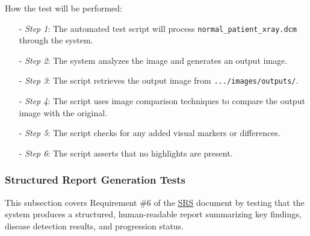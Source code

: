 \documentclass[12pt, titlepage]{article}
\begin{document}
\begin{enumerate}
How the test will be performed:
\begin{itemize}
\item[-] \textit{Step 1}: The automated test script will process \texttt{normal\_patient\_xray.dcm} through the system.
\item[-] \textit{Step 2}: The system analyzes the image and generates an output image.
\item[-] \textit{Step 3}: The script retrieves the output image from \texttt{.../images/outputs/}.
\item[-] \textit{Step 4}: The script uses image comparison techniques to compare the output image with the original.
\item[-] \textit{Step 5}: The script checks for any added visual markers or differences.
\item[-] \textit{Step 6}: The script asserts that no highlights are present.
\end{itemize}
\end{enumerate}

\subsubsection{Structured Report Generation Tests}

This subsection covers Requirement \#6 of the \href{https://github.com/RezaJodeiri/CXR-Capstone/blob/main/docs/SRS/SRS.pdf}{SRS} \citep{SRS}
document by testing that the system produces a structured, human-readable report summarizing key findings, disease detection results, and progression status.
\end{document}
